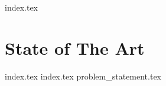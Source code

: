 {index.tex}
\chapter{State of The Art}\label{cha:sota}
{index.tex}
{index.tex}
{problem_statement.tex}
